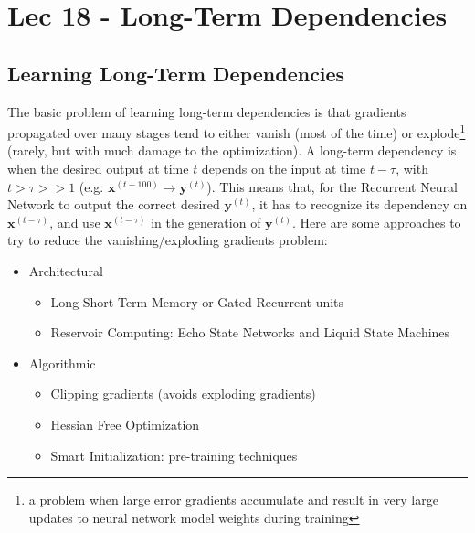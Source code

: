 \chapter{Lec 18 - Long-Term Dependencies}

\section{Learning Long-Term Dependencies}
The basic problem of learning long-term dependencies is that gradients propagated over many stages tend to either vanish (most of the time) or explode\footnote{a problem when large error gradients accumulate and result in very large updates to neural network model weights during training} (rarely, but with much damage to the optimization).\newline\newline
A long-term dependency is when the desired output at time $t$ depends on the input at time $t - \tau$, with $t > \tau >> 1$ (e.g. $\textbf{x}^{(t - 100)} \rightarrow \textbf{y}^{(t)}$).\newline\newline
This means that, for the Recurrent Neural Network to output the correct
desired $\textbf{y}^{(t)}$, it has to recognize its dependency on $\textbf{x}^{(t - \tau)}$, and use $\textbf{x}^{(t - \tau)}$ in the generation of $\textbf{y}^{(t)}$.
\newline\newline
Here are some approaches to try to reduce the vanishing/exploding gradients
problem:
\begin{itemize}
    \item Architectural
    \begin{itemize}
        \item Long Short-Term Memory or Gated Recurrent units
        \item Reservoir Computing: Echo State Networks and Liquid State Machines
    \end{itemize}
    \item Algorithmic
    \begin{itemize}
        \item Clipping gradients (avoids exploding gradients)
        \item Hessian Free Optimization
        \item Smart Initialization: pre-training techniques
    \end{itemize}
\end{itemize}

